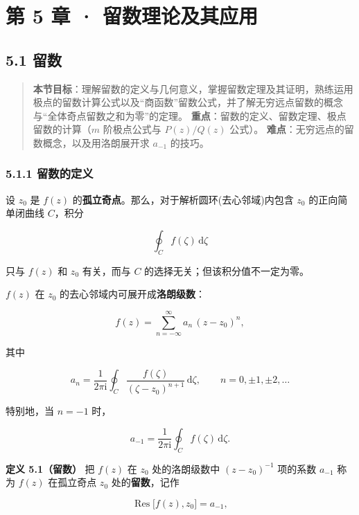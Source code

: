 \chapter{第 5 章 ·
留数理论及其应用}\label{ux7b2c-5-ux7ae0-ux7559ux6570ux7406ux8bbaux53caux5176ux5e94ux7528}

\section{5.1 留数}\label{ux7559ux6570}

\begin{quote}
\textbf{本节目标}：理解留数的定义与几何意义，掌握留数定理及其证明，熟练运用极点的留数计算公式以及``商函数''留数公式，并了解无穷远点留数的概念与``全体奇点留数之和为零''的定理。
\textbf{重点}：留数的定义、留数定理、极点留数的计算（\(m\) 阶极点公式与
\(P(z)/Q(z)\) 公式）。
\textbf{难点}：无穷远点的留数概念，以及用洛朗展开求 \(a_{-1}\) 的技巧。
\end{quote}

\subsection{5.1.1 留数的定义}\label{ux7559ux6570ux7684ux5b9aux4e49}

设 \(z_0\) 是 \(f(z)\)
的\textbf{孤立奇点}。那么，对于解析圆环(去心邻域)内包含 \(z_0\)
的正向简单闭曲线 \(C\)，积分

\[
\oint_C f(\zeta)\,\mathrm d\zeta
\]

只与 \(f(z)\) 和 \(z_0\) 有关，而与 \(C\)
的选择无关；但该积分值不一定为零。

\(f(z)\) 在 \(z_0\) 的去心邻域内可展开成\textbf{洛朗级数}：

\[
f(z)=\sum_{n=-\infty}^{\infty}a_n\,(z-z_0)^{n},
\]

其中

\[
a_n=\frac{1}{2\pi\mathrm i}\oint_C\frac{f(\zeta)}{(\zeta-z_0)^{n+1}}\,\mathrm d\zeta,\qquad n=0,\pm1,\pm2,\ldots
\]

特别地，当 \(n=-1\) 时，

\[
a_{-1}=\frac{1}{2\pi\mathrm i}\oint_C f(\zeta)\,\mathrm d\zeta .
\]

\textbf{定义 5.1（留数）} 把 \(f(z)\) 在 \(z_0\) 处的洛朗级数中
\((z-z_0)^{-1}\) 项的系数 \(a_{-1}\) 称为 \(f(z)\) 在孤立奇点 \(z_0\)
处的\textbf{留数}，记作

\[
\operatorname{Res}\bigl[f(z),z_0\bigr]=a_{-1},
\]

